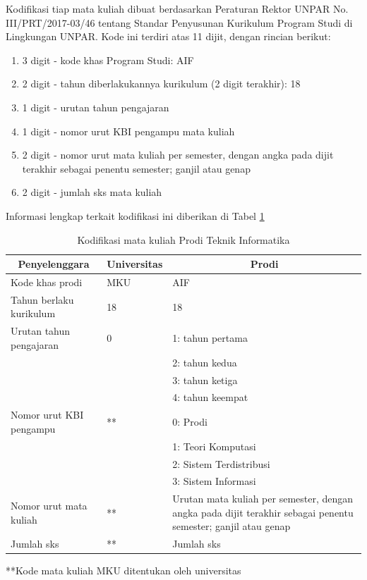Kodifikasi tiap mata kuliah dibuat berdasarkan Peraturan Rektor UNPAR No. III/PRT/2017-03/46 tentang Standar Penyusunan Kurikulum Program Studi di Lingkungan UNPAR. Kode ini terdiri atas 11 dijit, dengan rincian berikut:
\begin{enumerate}
	\item 3 digit - kode khas Program Studi: AIF
	\item 2 digit - tahun diberlakukannya kurikulum (2 digit terakhir): 18
	\item 1 digit - urutan tahun pengajaran
	\item 1 digit - nomor urut KBI pengampu mata kuliah
	\item 2 digit - nomor urut mata kuliah per semester, dengan angka pada dijit terakhir sebagai penentu semester; ganjil atau genap
	\item 2 digit - jumlah sks mata kuliah
\end{enumerate}
Informasi lengkap terkait kodifikasi ini diberikan di Tabel \ref{tab:2_kodifikasi_matakuliah}
\begin{table}[H]
	\centering
	\caption{Kodifikasi mata kuliah Prodi Teknik Informatika}
    \begin{tabular}{|p{4.75cm}|p{3.5cm}|p{5.25cm}|}
		\hline
		\multicolumn{1}{|c}{\textbf{Penyelenggara}} & \multicolumn{1}{|c|}{\textbf{Universitas}} & \multicolumn{1}{c|}{\textbf{Prodi}}\\
		\hline
    Kode khas prodi & MKU & AIF \\
		\hline
		Tahun berlaku kurikulum & 18 & 18 \\
		\hline
		Urutan tahun pengajaran & 0 & 1: tahun pertama \\
		                        &   & 2: tahun kedua \\
		                        &   & 3: tahun ketiga \\
		                        &   & 4: tahun keempat \\
		\hline
		Nomor urut KBI pengampu & ** & 0: Prodi \\
		                        &   & 1: Teori Komputasi \\
		                        &   & 2: Sistem Terdistribusi \\
		                        &   & 3: Sistem Informasi \\
		\hline
		Nomor urut mata kuliah & ** & Urutan mata kuliah per semester, dengan angka pada dijit terakhir sebagai penentu semester; ganjil atau genap\\
		\hline
		Jumlah sks & ** & Jumlah sks\\
		\hline
    \end{tabular}
	\label{tab:2_kodifikasi_matakuliah}
\end{table}
**Kode mata kuliah MKU ditentukan oleh universitas

